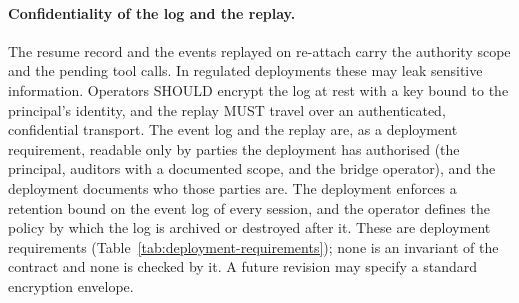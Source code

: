 \paragraph{Confidentiality of the log and the replay.} The resume
record and the events replayed on re-attach carry the authority scope
and the pending tool calls. In regulated deployments these may leak
sensitive information. Operators SHOULD encrypt the log at rest with a
key bound to the principal's identity, and the replay MUST travel over
an authenticated, confidential transport. The event log and the replay
are, as a deployment requirement, readable only by parties the
deployment has authorised (the principal, auditors with a documented
scope, and the bridge operator), and the deployment documents who those
parties are. The deployment enforces a retention bound on the event log
of every session, and the operator defines the policy by which the log
is archived or destroyed after it. These are deployment requirements
(Table~\ref{tab:deployment-requirements}); none is an invariant of the contract and none
is checked by it. A future revision may specify
a standard encryption envelope.

